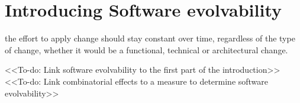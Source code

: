 \section{Introducing Software evolvability}
the effort to apply change should stay constant over time, regardless of the type of change,
whether it would be a functional, technical or architectural change.

<<To-do: Link software evolvability to the first part of the introduction>>\\
<<To-do: Link combinatorial effects to a measure to determine software evolvability>>